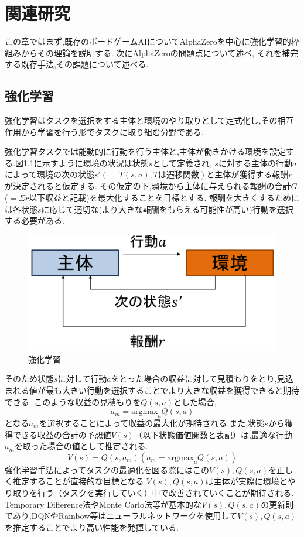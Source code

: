\chapter{関連研究}
この章ではまず,既存のボードゲームAIについてAlphaZeroを中心に強化学習的枠組みからその理論を説明する.
次にAlphaZeroの問題点について述べ,
それを補完する既存手法,その課題について述べる.



\section{強化学習}
強化学習はタスクを選択をする主体と環境のやり取りとして定式化し,その相互作用から学習を行う形でタスクに取り組む分野である\cite{RL}.

強化学習タスクでは能動的に行動を行う主体と,主体が働きかける環境を設定する.図\ref{fig:RL}に示すように環境の状況は状態$s$として定義され,
$s$に対する主体の行動$a$によって環境の次の状態${s'}(=T(s, a), Tは遷移関数)$と主体が獲得する報酬$r$が決定されると仮定する.
その仮定の下,環境から主体に与えられる報酬の合計$G$($=\Sigma r$以下収益と記載)を最大化することを目標とする.
報酬を大きくするためには各状態$s$に応じて適切な(より大きな報酬をもらえる可能性が高い)行動を選択する必要がある.
\begin{figure}[t]
	\centering
	\includegraphics[width=\linewidth]{./figure/RL.png}
	\caption{強化学習}
	\label{fig:RL}
\end{figure}
そのため状態$s$に対して行動$a$をとった場合の収益に対して見積もりをとり,見込まれる値が最も大きい行動を選択することでより大きな収益を獲得できると期待できる.
このような収益の見積もりを$Q(s, a)$とした場合,
\begin{equation}
	{\displaystyle a_m = {\textrm{argmax}}_{a} Q(s, a)}
\end{equation}
となる$a_m$を選択することによって収益の最大化が期待される.また,状態$s$から獲得できる収益の合計の予想値$V(s)$（以下状態価値関数と表記）は,最適な行動$a_m$を取った場合の値として推定される.
\begin{equation}
	{\displaystyle V(s) = Q(s, a_m)(a_m = \textrm{argmax}_{a} Q(s, a))}
\end{equation}
強化学習手法によってタスクの最適化を図る際にはこの$V(s),Q(s, a)$を正しく推定することが直接的な目標となる.$V(s),Q(s, a)$は主体が実際に環境とやり取りを行う（タスクを実行していく）中で改善されていくことが期待される.
Temporary Difference法やMonte Carlo法等が基本的な$V(s),Q(s, a)$の更新則であり,DQN\cite{DQN}やRainbow\cite{rainbow}等はニューラルネットワークを使用して$V(s),Q(s, a)$
を推定することでより高い性能を発揮している.




